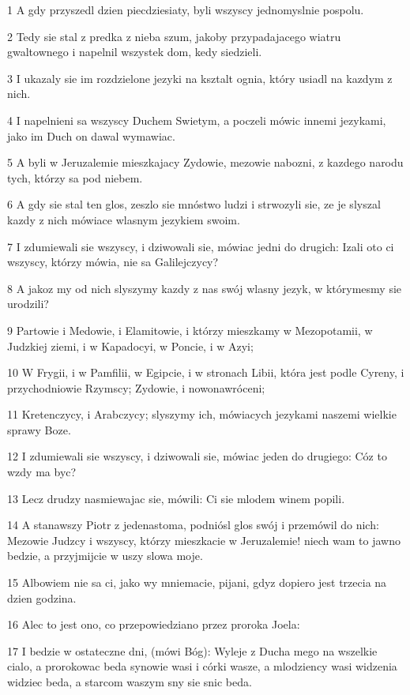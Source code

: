 \par 1 A gdy przyszedl dzien piecdziesiaty, byli wszyscy jednomyslnie pospolu.
\par 2 Tedy sie stal z predka z nieba szum, jakoby przypadajacego wiatru gwaltownego i napelnil wszystek dom, kedy siedzieli.
\par 3 I ukazaly sie im rozdzielone jezyki na ksztalt ognia, który usiadl na kazdym z nich.
\par 4 I napelnieni sa wszyscy Duchem Swietym, a poczeli mówic innemi jezykami, jako im Duch on dawal wymawiac.
\par 5 A byli w Jeruzalemie mieszkajacy Zydowie, mezowie nabozni, z kazdego narodu tych, którzy sa pod niebem.
\par 6 A gdy sie stal ten glos, zeszlo sie mnóstwo ludzi i strwozyli sie, ze je slyszal kazdy z nich mówiace wlasnym jezykiem swoim.
\par 7 I zdumiewali sie wszyscy, i dziwowali sie, mówiac jedni do drugich: Izali oto ci wszyscy, którzy mówia, nie sa Galilejczycy?
\par 8 A jakoz my od nich slyszymy kazdy z nas swój wlasny jezyk, w którymesmy sie urodzili?
\par 9 Partowie i Medowie, i Elamitowie, i którzy mieszkamy w Mezopotamii, w Judzkiej ziemi, i w Kapadocyi, w Poncie, i w Azyi;
\par 10 W Frygii, i w Pamfilii, w Egipcie, i w stronach Libii, która jest podle Cyreny, i przychodniowie Rzymscy; Zydowie, i nowonawróceni;
\par 11 Kretenczycy, i Arabczycy; slyszymy ich, mówiacych jezykami naszemi wielkie sprawy Boze.
\par 12 I zdumiewali sie wszyscy, i dziwowali sie, mówiac jeden do drugiego: Cóz to wzdy ma byc?
\par 13 Lecz drudzy nasmiewajac sie, mówili: Ci sie mlodem winem popili.
\par 14 A stanawszy Piotr z jedenastoma, podniósl glos swój i przemówil do nich: Mezowie Judzcy i wszyscy, którzy mieszkacie w Jeruzalemie! niech wam to jawno bedzie, a przyjmijcie w uszy slowa moje.
\par 15 Albowiem nie sa ci, jako wy mniemacie, pijani, gdyz dopiero jest trzecia na dzien godzina.
\par 16 Alec to jest ono, co przepowiedziano przez proroka Joela:
\par 17 I bedzie w ostateczne dni, (mówi Bóg): Wyleje z Ducha mego na wszelkie cialo, a prorokowac beda synowie wasi i córki wasze, a mlodziency wasi widzenia widziec beda, a starcom waszym sny sie snic beda.
